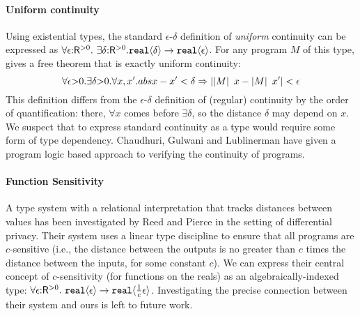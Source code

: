 \paragraph{Uniform continuity}
Using %
existential types, %
the standard $\epsilon$-$\delta$ definition of
\emph{uniform} continuity can be expressed as %
$  \forall \epsilon \mathord: \mathsf{R}^{>0}.\ \exists \delta\mathord: \mathsf{R}^{>0}.\\ \textup{\texttt{real}}\langle \delta \rangle \to \textup{\texttt{real}}\langle \epsilon \rangle$.
For any program $M$ of this type, %
 gives a free theorem that is exactly 
uniform continuity:
\begin{displaymath}
  \forall \epsilon \mathord> 0. \exists \delta \mathord> 0. \forall x,x'. abs{x - x'} < \delta \Rightarrow \lvert \left| M\right|\ x - \left| M\right|\ x' \rvert < \epsilon
\end{displaymath}
This definition differs from the $\epsilon$-$\delta$ definition of
(regular) continuity by the order of quantification:
there, $\forall x$ comes before $\exists \delta$, so the distance
$\delta$ may depend on %
$x$. We suspect that to express standard continuity as a type would
require some form of type dependency. Chaudhuri, Gulwani and
Lublinerman \cite{chaudhuri10continuity} have given a program logic
based approach to verifying the continuity of programs.

\paragraph{Function Sensitivity}
A type system with a relational interpretation that tracks distances
between values has %
been investigated by Reed and Pierce \cite{reed10distance} in the
setting of differential privacy. Their system uses a linear type
discipline to ensure that all programs are $c$-sensitive (i.e., the
distance between the outputs is no greater than $c$ times the
distance between the inputs, for some constant $c$). We can express
their central concept of $c$-sensitivity (for functions on the reals)
as an algebraically-indexed type: $\forall
\epsilon\mathord:\mathsf{R}^{>0}.\ \textup{\texttt{real}}\langle \epsilon \rangle \to
\textup{\texttt{real}}\langle \frac{1}{c}\epsilon \rangle$. Investigating the precise
connection between their system and ours is left to future work.



